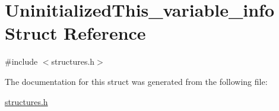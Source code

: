 \hypertarget{structUninitializedThis__variable__info}{}\section{Uninitialized\+This\+\_\+variable\+\_\+info Struct Reference}
\label{structUninitializedThis__variable__info}


{\ttfamily \#include $<$structures.\+h$>$}



The documentation for this struct was generated from the following file\+:\begin{DoxyCompactItemize}
\item 
\hyperlink{structures_8h}{structures.\+h}\end{DoxyCompactItemize}
